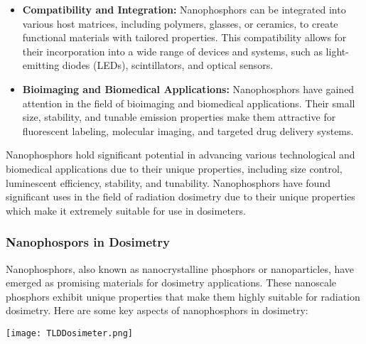 \documentclass[../introduction.tex]{subfiles}
\begin{document}
\begin{itemize}
        \item \textbf{Compatibility and Integration: } Nanophosphors can be integrated into various host 
        matrices, including polymers, glasses, or ceramics, to create functional materials with tailored 
        properties. This compatibility allows for their incorporation into a wide range of devices and 
        systems, such as light-emitting diodes (LEDs), scintillators, and optical sensors.

        \item \textbf{Bioimaging and Biomedical Applications: } Nanophosphors have gained attention in the 
        field of bioimaging and biomedical applications. Their small size, stability, and tunable emission 
        properties make them attractive for fluorescent labeling, molecular imaging, and targeted drug 
        delivery systems.
    \end{itemize}

    Nanophosphors hold significant potential in advancing various technological and biomedical applications 
    due to their unique properties, including size control, luminescent efficiency, stability, and tunability.
    Nanophosphors have found significant uses in the field of radiation dosimetry due to their unique 
    properties which make it extremely suitable for use in dosimeters.
    
    \subsubsection*{\large Nanophospors in Dosimetry}
        Nanophosphors, also known as nanocrystalline phosphors or nanoparticles, have emerged as promising 
        materials for dosimetry applications. These nanoscale phosphors exhibit unique properties that make 
        them highly suitable for radiation dosimetry. Here are some key aspects of nanophosphors in dosimetry:

        \begin{Figure}
            \centering
            \texttt{[image: TLDDosimeter.png]}
            \label{fig:TLDDosimeter}
        \end{Figure}
\end{document}
